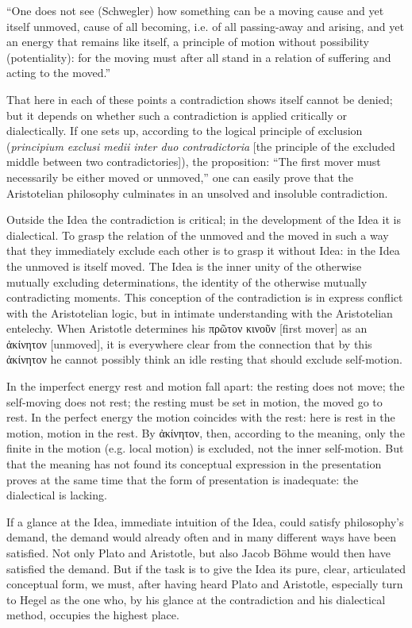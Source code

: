 \documentclass[12pt]{book}
\begin{document}
``One does not see (Schwegler) how something can be a moving cause and yet itself unmoved, cause of
all becoming, i.e. of all passing-away and arising, and yet an energy that remains like itself, a
principle of motion without possibility (potentiality): for the moving must after all stand in a
relation of suffering and acting to the moved.''

That here in each of these points a contradiction shows itself cannot be denied; but it depends on
whether such a contradiction is applied critically or dialectically. If one sets up, according to
the logical principle of exclusion (\textit{principium exclusi medii inter duo contradictoria} [the
principle of the excluded middle between two contradictories]), the proposition: ``The first mover
must necessarily be either moved or unmoved,'' one can easily prove that the Aristotelian philosophy
culminates in an unsolved and insoluble contradiction.

Outside the Idea the contradiction is critical; in the development of the Idea it is dialectical. To
grasp the relation of the unmoved and the moved in such a way that they immediately exclude each
other is to grasp it without Idea: in the Idea the unmoved is itself moved. The Idea is the inner
unity of the otherwise mutually excluding determinations, the identity of the otherwise mutually
contradicting moments.
This conception of the contradiction is in express conflict with the Aristotelian logic, but in
intimate understanding with the Aristotelian entelechy. When Aristotle determines his πρῶτον κινοῦν
[first mover] as an ἀκίνητον [unmoved], it is everywhere clear from the connection that by this
ἀκίνητον he cannot possibly think an idle resting that should exclude self-motion.

In the imperfect energy rest and motion fall apart: the resting does not move; the self-moving does
not rest; the resting must be set in motion, the moved go to rest. In the perfect energy the motion
coincides with the rest: here is rest in the motion, motion in the rest. By ἀκίνητον, then, according
to the meaning, only the finite in the motion (e.g. local motion) is excluded, not the inner
self-motion. But that the meaning has not found its conceptual expression in the presentation proves
at the same time that the form of presentation is inadequate: the dialectical is lacking.

If a glance at the Idea, immediate intuition of the Idea, could satisfy philosophy's demand, the
demand would already often and in many different ways have been satisfied. Not only Plato and
Aristotle, but also Jacob Böhme would then have satisfied the demand. But if the task is to give the
Idea its pure, clear, articulated conceptual form, we must, after having heard Plato and Aristotle,
especially turn to Hegel as the one who, by his glance at the contradiction and his dialectical
method, occupies the highest place.
\end{document}
